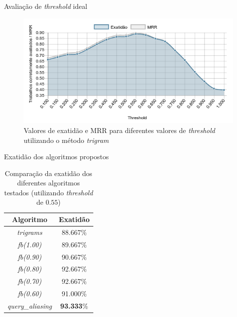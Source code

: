 \documentclass{beamer}
\begin{document}
\begin{frame}{Avaliação de \textit{threshold} ideal}
  \begin{figure}
    \includegraphics[width=\textwidth]{figuras/avaliacao-threshold.png}
    \caption{Valores de exatidão e MRR para diferentes valores de \textit{threshold} utilizando o método \textit{trigram}}
  \end{figure}
\end{frame}

\begin{frame}{Exatidão dos algoritmos propostos}
  \begin{table}
    \begin{tabular}{ c | c }
      \textbf{Algoritmo} & \textbf{Exatidão} \\
      \hline \hline
      \textit{trigrams} & 88.667\% \\
      \textit{fb(1.00)} & 89.667\% \\
      \textit{fb(0.90)} & 90.667\% \\
      \textit{fb(0.80)} & 92.667\% \\
      \textit{fb(0.70)} & 92.667\% \\
      \textit{fb(0.60)} & 91.000\% \\
      \textit{query\_aliasing} & \textbf{93.333}\%
    \end{tabular}
    \caption{Comparação da exatidão dos diferentes algoritmos testados (utilizando \textit{threshold} de $0.55$)}
  \end{table}
\end{frame}
\end{document}
